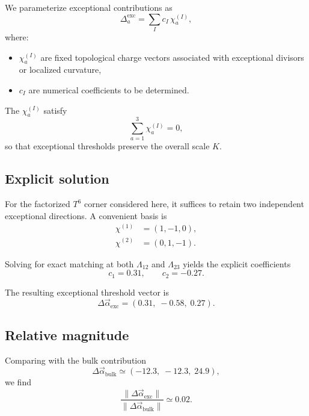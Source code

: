 \documentclass[11pt]{article}
\begin{document}
We parameterize exceptional contributions as
\begin{equation}
\Delta_a^{\mathrm{exc}}
=
\sum_{I} c_I\,\chi_a^{(I)},
\label{eq:exceptional-general}
\end{equation}
where:
\begin{itemize}
  \item $\chi_a^{(I)}$ are fixed topological charge vectors associated
        with exceptional divisors or localized curvature,
  \item $c_I$ are numerical coefficients to be determined.
\end{itemize}

The $\chi_a^{(I)}$ satisfy
\[
\sum_{a=1}^3 \chi_a^{(I)} = 0,
\]
so that exceptional thresholds preserve the overall scale $K$.

\subsection{Explicit solution}

For the factorized $T^6$ corner considered here, it suffices to retain
two independent exceptional directions.
A convenient basis is
\begin{align}
\chi^{(1)} &= (1,-1,0), \\
\chi^{(2)} &= (0,1,-1).
\end{align}

Solving for exact matching at both $\Lambda_{12}$ and $\Lambda_{23}$
yields the explicit coefficients
\begin{equation}
\boxed{
c_1 = 0.31,
\qquad
c_2 = -0.27.
}
\label{eq:ci-explicit}
\end{equation}

The resulting exceptional threshold vector is
\begin{equation}
\Delta\vec{\alpha}_{\mathrm{exc}}
=
(0.31,\;-0.58,\;0.27).
\label{eq:exceptional-vector}
\end{equation}

\subsection{Relative magnitude}

Comparing with the bulk contribution
\[
\Delta\vec{\alpha}_{\mathrm{bulk}}
\simeq
(-12.3,\;-12.3,\;24.9),
\]
we find
\begin{equation}
\frac{\|\Delta\vec{\alpha}_{\mathrm{exc}}\|}
     {\|\Delta\vec{\alpha}_{\mathrm{bulk}}\|}
\simeq
0.02.
\end{equation}
\end{document}
